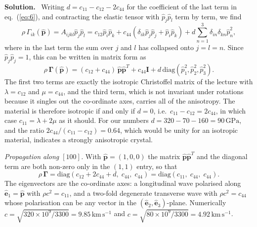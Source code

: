 \documentclass[a4paper,12pt]{paper}
\newenvironment{solution}{\par\noindent\textbf{Solution.}\ }{\par\medskip}
\begin{document}
\begin{solution}
Writing $d=c_{11}-c_{12}-2c_{44}$ for the coefficient of the last term in eq.~(\ref{eq:6}), and
contracting the elastic tensor with $\hat{p}_{j}\hat{p}_{l}$ term by term, we find
\begin{equation}
\rho\,\Gamma_{ik}(\hat{\mathbf{p}})=A_{ijkl}\hat{p}_{j}\hat{p}_{l}
=c_{12}\hat{p}_{i}\hat{p}_{k}+c_{44}(\delta_{ik}\hat{p}_{j}\hat{p}_{j}+\hat{p}_{i}\hat{p}_{k})
+d\sum_{n=1}^{3}\delta_{in}\delta_{kn}\hat{p}_{n}^{2},
\label{eq:7}
\end{equation}
where in the last term the sum over $j$ and $l$ has collapsed onto $j=l=n$. Since
$\hat{p}_{j}\hat{p}_{j}=1$, this can be written in matrix form as
\begin{equation}
\rho\,\bm{\Gamma}(\hat{\mathbf{p}})=(c_{12}+c_{44})\,\hat{\mathbf{p}}\hat{\mathbf{p}}^{T}+c_{44}\mathbf{I}
+d\,\mathrm{diag}(\hat{p}_{1}^{2},\hat{p}_{2}^{2},\hat{p}_{3}^{2}).
\label{eq:8}
\end{equation}
The first two terms are exactly the isotropic Christoffel matrix of the lecture with
$\lambda=c_{12}$ and $\mu=c_{44}$, and the third term, which is not invariant under rotations
because it singles out the co-ordinate axes, carries all of the anisotropy. The material is
therefore isotropic if and only if $d=0$, i.e.\ $c_{11}-c_{12}=2c_{44}$, in which case
$c_{11}=\lambda+2\mu$ as it should. For our numbers $d=320-70-160=90\,\mathrm{GPa}$, and the
ratio $2c_{44}/(c_{11}-c_{12})=0.64$, which would be unity for an isotropic material, indicates a
strongly anisotropic crystal.

\emph{Propagation along $[100]$.} With $\hat{\mathbf{p}}=(1,0,0)$ the matrix
$\hat{\mathbf{p}}\hat{\mathbf{p}}^{T}$ and the diagonal term are both non-zero only in the
$(1,1)$ entry, so that
\begin{equation}
\rho\,\bm{\Gamma}=\mathrm{diag}(c_{12}+2c_{44}+d,\;c_{44},\;c_{44})=\mathrm{diag}(c_{11},\;c_{44},\;c_{44}).
\label{eq:9}
\end{equation}
The eigenvectors are the co-ordinate axes: a longitudinal wave polarised along
$\hat{\mathbf{e}}_{1}=\hat{\mathbf{p}}$ with $\rho c^{2}=c_{11}$, and a two-fold degenerate
transverse wave with $\rho c^{2}=c_{44}$ whose polarisation can be any vector in the
$(\hat{\mathbf{e}}_{2},\hat{\mathbf{e}}_{3})$-plane. Numerically
$c=\sqrt{320\times10^{9}/3300}=9.85\,\mathrm{km\,s^{-1}}$ and
$c=\sqrt{80\times10^{9}/3300}=4.92\,\mathrm{km\,s^{-1}}$.


\end{solution}
\end{document}
